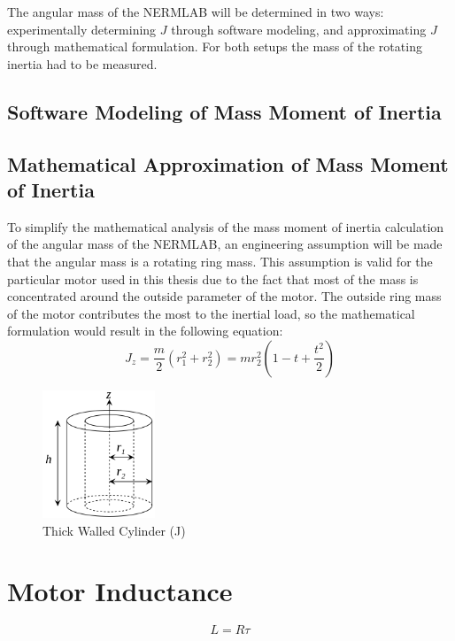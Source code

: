 The angular mass of the NERMLAB will be determined in two ways: experimentally determining \(J\) through software modeling, and approximating \(J\) through mathematical formulation. For both setups the mass of the rotating inertia had to be measured.

\subsection{Software Modeling of Mass Moment of Inertia}
\subsection{Mathematical Approximation of Mass Moment of Inertia}
To simplify the mathematical analysis of the mass moment of inertia calculation of the angular mass of the NERMLAB, an engineering assumption will be made that the angular mass is a rotating ring mass. This assumption is valid for the particular motor used in this thesis due to the fact that most of the mass is concentrated around the outside parameter of the motor. The outside ring mass of the motor contributes the most to the inertial load, so the mathematical formulation would result in the following equation:
\[J_z = \frac{m}{2}(r_1^2 + r_2^2) = mr_2^2(1-t+\frac{t^2}{2})\]

\begin{figure}[htb]%
\begin{center}
    \includegraphics[height=1.5in]{figures/thick_walled_cylinder.png}

    \caption[Thick Walled Cylinder - Mass Moment of Inertia]{Thick Walled Cylinder (J)}

    \label{thick_walled_cylinder}
\end{center}
\end{figure}

\section{Motor Inductance}

\[L = R\tau\]